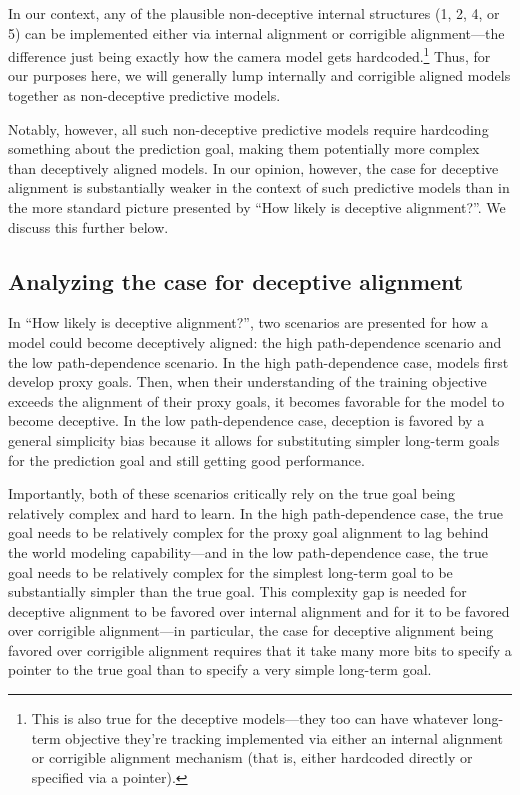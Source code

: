 \documentclass[
  twocolumn,
  natbib,
]{miri-tech-article}
\begin{document}
In our context, any of the plausible non-deceptive internal structures (1, 2, 4, or 5) can be implemented either via internal alignment or corrigible alignment---the difference just being exactly how the camera model gets hardcoded.\footnote{This is also true for the deceptive models---they too can have whatever long-term objective they're tracking implemented via either an internal alignment or corrigible alignment mechanism (that is, either hardcoded directly or specified via a pointer).} Thus, for our purposes here, we will generally lump internally and corrigible aligned models together as non-deceptive predictive models.

Notably, however, all such non-deceptive predictive models require hardcoding something about the prediction goal, making them potentially more complex than deceptively aligned models. In our opinion, however, the case for deceptive alignment is substantially weaker in the context of such predictive models than in the more standard picture presented by ``How likely is deceptive alignment?\cite{how_likely_deception}''. We discuss this further below.


\subsection{Analyzing the case for deceptive alignment}

In ``How likely is deceptive alignment?\cite{how_likely_deception}'', two scenarios are presented for how a model could become deceptively aligned: the high path-dependence scenario and the low path-dependence scenario. In the high path-dependence case, models first develop proxy goals. Then, when their understanding of the training objective exceeds the alignment of their proxy goals, it becomes favorable for the model to become deceptive. In the low path-dependence case, deception is favored by a general simplicity bias because it allows for substituting simpler long-term goals for the prediction goal and still getting good performance.

Importantly, both of these scenarios critically rely on the true goal being relatively complex and hard to learn. In the high path-dependence case, the true goal needs to be relatively complex for the proxy goal alignment to lag behind the world modeling capability---and in the low path-dependence case, the true goal needs to be relatively complex for the simplest long-term goal to be substantially simpler than the true goal. This complexity gap is needed for deceptive alignment to be favored over internal alignment and for it to be favored over corrigible alignment---in particular, the case for deceptive alignment being favored over corrigible alignment requires that it take many more bits to specify a pointer to the true goal than to specify a very simple long-term goal.
\end{document}
